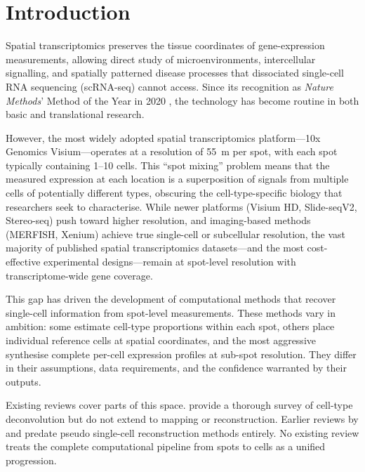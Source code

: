 \section{Introduction}
\label{sec:intro}

Spatial transcriptomics preserves the tissue coordinates of gene-expression measurements, allowing direct study of microenvironments, intercellular signalling, and spatially patterned disease processes that dissociated single-cell RNA sequencing (scRNA-seq) cannot access. Since its recognition as \emph{Nature Methods}' Method of the Year in 2020 \citep{marx2021method}, the technology has become routine in both basic and translational research.

However, the most widely adopted spatial transcriptomics platform---10x Genomics Visium---operates at a resolution of 55~\textmu m per spot, with each spot typically containing 1--10 cells. This ``spot mixing'' problem means that the measured expression at each location is a superposition of signals from multiple cells of potentially different types, obscuring the cell-type-specific biology that researchers seek to characterise. While newer platforms (Visium HD, Slide-seqV2, Stereo-seq) push toward higher resolution, and imaging-based methods (MERFISH, Xenium) achieve true single-cell or subcellular resolution, the vast majority of published spatial transcriptomics datasets---and the most cost-effective experimental designs---remain at spot-level resolution with transcriptome-wide gene coverage.

This gap has driven the development of computational methods that recover single-cell information from spot-level measurements. These methods vary in ambition: some estimate cell-type proportions within each spot, others place individual reference cells at spatial coordinates, and the most aggressive synthesise complete per-cell expression profiles at sub-spot resolution. They differ in their assumptions, data requirements, and the confidence warranted by their outputs.

Existing reviews cover parts of this space. \citet{gaspardboulinc2025deconvolution} provide a thorough survey of cell-type deconvolution but do not extend to mapping or reconstruction. Earlier reviews by \citet{longo2021integrating} and \citet{tian2023expanding} predate pseudo single-cell reconstruction methods entirely. No existing review treats the complete computational pipeline from spots to cells as a unified progression.


